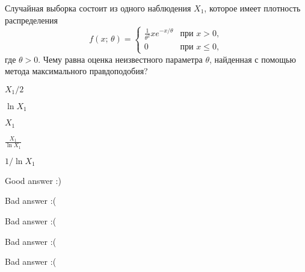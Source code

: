 
\begin{question}
Случайная выборка состоит из одного наблюдения \(X_1\), которое имеет
плотность распределения \[
f(x; \, \theta) = \begin{cases}
    \tfrac{1}{\theta^2} x e^{-x/\theta} & \text{при } x > 0,  \\
    0 & \text{при }x\leq 0,
  \end{cases}
\] где \(\theta > 0\). Чему равна оценка неизвестного параметра
\(\theta\), найденная с помощью метода максимального правдоподобия?
\begin{answerlist}
  \item \(X_1 / 2\)
  \item \(\ln X_1\)
  \item \(X_1\)
  \item \(\frac{X_1}{\ln X_1}\)
  \item \(1 / \ln X_1\)
\end{answerlist}
\end{question}

\begin{solution}
\begin{answerlist}
  \item Good answer :)
  \item Bad answer :(
  \item Bad answer :(
  \item Bad answer :(
  \item Bad answer :(
\end{answerlist}
\end{solution}

